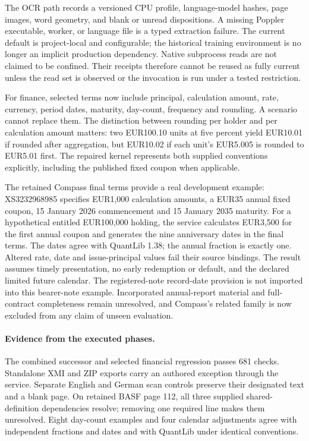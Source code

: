 The OCR path records a versioned CPU profile, language-model hashes, page images,
word geometry, and blank or unread dispositions.  A missing Poppler executable,
worker, or language file is a typed extraction failure.  The current default
is project-local and configurable; the historical training environment is no
longer an implicit production dependency.  Native subprocess reads are not
claimed to be confined.  Their receipts therefore cannot be reused as fully
current unless the read set is observed or the invocation is run under a tested
restriction.

For finance, selected terms now include principal, calculation amount, rate,
currency, period dates, maturity, day-count, frequency and rounding.  A scenario
cannot replace them.  The distinction between rounding per holder and per
calculation amount matters: two EUR100.10 units at five percent yield EUR10.01
if rounded after aggregation, but EUR10.02 if each unit's EUR5.005 is rounded
to EUR5.01 first.  The repaired kernel represents both supplied conventions
explicitly, including the published fixed coupon when applicable.

The retained Compass final terms provide a real development example:
XS3232968985 specifies EUR1,000 calculation amounts, a EUR35 annual fixed coupon,
15 January 2026 commencement and 15 January 2035 maturity.  For a hypothetical
entitled EUR100,000 holding, the service calculates EUR3,500 for the first
annual coupon and generates the nine anniversary dates in the final terms.
The dates agree with QuantLib 1.38; the annual fraction is exactly one.  Altered
rate, date and issue-principal values fail their source bindings.  The result
assumes timely presentation, no early redemption or default, and the declared
limited future calendar.  The registered-note record-date provision is not
imported into this bearer-note example.  Incorporated annual-report material
and full-contract completeness remain unresolved, and Compass's related family
is now excluded from any claim of unseen evaluation.

\paragraph{Evidence from the executed phases.}
The combined successor and selected financial regression passes 681 checks.
Standalone XMI and ZIP exports carry an authored exception through the service.
Separate English and German scan controls preserve their designated text and a
blank page.  On retained BASF page 112, all three supplied shared-definition
dependencies resolve; removing one required line makes them unresolved.  Eight
day-count examples and four calendar adjustments agree with independent
fractions and dates and with QuantLib under identical conventions.

